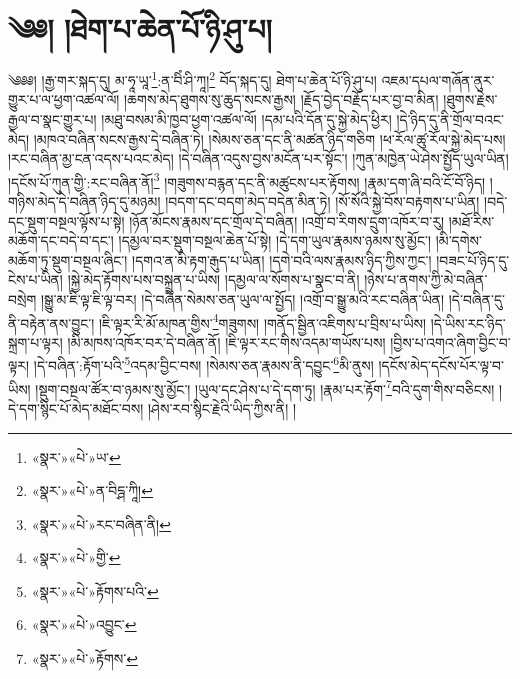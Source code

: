 \chapter{༄༅། །ཐེག་པ་ཆེན་པོ་ཉི་ཤུ་པ།}༄༅༅། །རྒྱ་གར་སྐད་དུ། མ་ཧཱ་ཡཱ་\footnote{«སྣར་»«པེ་»ཡ་}:ན་བིཾ་ཤི་ཀཱ།\footnote{«སྣར་»«པེ་»ན་བིདྴ་ཀཱི།} བོད་སྐད་དུ། ཐེག་པ་ཆེན་པོ་ཉི་ཤུ་པ། འཇམ་དཔལ་གཞོན་ནུར་གྱུར་པ་ལ་ཕྱག་འཚལ་ལོ། །ཆགས་མེད་ཐུགས་སུ་ཆུད་སངས་རྒྱས། །རྗོད་བྱེད་བརྗོད་པར་བྱ་བ་མིན། །ཐུགས་རྗེས་རྒྱལ་བ་སྣང་གྱུར་པ། །མཐུ་བསམ་མི་ཁྱབ་ཕྱག་འཚལ་ལོ། །དམ་པའི་དོན་དུ་སྐྱེ་མེད་ཕྱིར། །དེ་ཉིད་དུ་ནི་གྲོལ་བའང་མེད། །མཁའ་བཞིན་སངས་རྒྱས་དེ་བཞིན་ཏེ། །སེམས་ཅན་དང་ནི་མཚན་ཉིད་གཅིག །ཕ་རོལ་ཚུ་རོལ་སྐྱེ་མེད་པས། །རང་བཞིན་མྱ་ངན་འདས་པའང་མེད། །དེ་བཞིན་འདུས་བྱས་མངོན་པར་སྟོང་། །ཀུན་མཁྱེན་ཡེ་ཤེས་སྤྱོད་ཡུལ་ཡིན། །དངོས་པོ་ཀུན་གྱི་:རང་བཞིན་ནོ།\footnote{«སྣར་»«པེ་»རང་བཞིན་ནི།} །གཟུགས་བརྙན་དང་ནི་མཚུངས་པར་རྟོགས། །རྣམ་དག་ཞི་བའི་ངོ་བོ་ཉིད། །གཉིས་མེད་དེ་བཞིན་ཉིད་དུ་མཉམ། །བདག་དང་བདག་མེད་བདེན་མིན་ཏེ། །སོ་སོའི་སྐྱེ་བོས་བརྟགས་པ་ཡིན། །བདེ་དང་སྡུག་བསྔལ་ལྟོས་པ་སྟེ། །ཉོན་མོངས་རྣམས་དང་གྲོལ་དེ་བཞིན། །འགྲོ་བ་རིགས་དྲུག་འཁོར་བ་རུ། །མཐོ་རིས་མཆོག་དང་བདེ་བ་དང་། །དམྱལ་བར་སྡུག་བསྔལ་ཆེན་པོ་སྟེ། །དེ་དག་ཡུལ་རྣམས་ཉམས་སུ་མྱོང་། །མི་དགེས་མཆོག་ཏུ་སྡུག་བསྔལ་ཞིང་། །དགའ་ན་མི་རྟག་རྒུད་པ་ཡིན། །དགེ་བའི་ལས་རྣམས་ཉིད་ཀྱིས་ཀྱང་། །བཟང་པོ་ཉིད་དུ་ངེས་པ་ཡིན། །སྐྱེ་མེད་རྟོགས་པས་བསྐྲུན་པ་ཡིས། །དམྱལ་ལ་སོགས་པ་སྣང་བ་ནི། །ཉེས་པ་ནགས་ཀྱི་མེ་བཞིན་བསྲེག །སྒྱུ་མ་ཇི་ལྟ་ཇི་ལྟ་བར། །དེ་བཞིན་སེམས་ཅན་ཡུལ་ལ་སྤྱོད། །འགྲོ་བ་སྒྱུ་མའི་རང་བཞིན་ཡིན། །དེ་བཞིན་དུ་ནི་བརྟེན་ནས་བྱུང་། །ཇི་ལྟར་རི་མོ་མཁན་གྱིས་\footnote{«སྣར་»«པེ་»གྱི་}གཟུགས། །གནོད་སྦྱིན་འཇིགས་པ་བྲིས་པ་ཡིས། །དེ་ཡིས་རང་ཉིད་སྐྲག་པ་ལྟར། །མི་མཁས་འཁོར་བར་དེ་བཞིན་ནོ། །ཇི་ལྟར་རང་གིས་འདམ་གཡོས་པས། །བྱིས་པ་འགའ་ཞིག་བྱིང་བ་ལྟར། །དེ་བཞིན་:རྟོག་པའི་\footnote{«སྣར་»«པེ་»རྟོགས་པའི་}འདམ་བྱིང་བས། །སེམས་ཅན་རྣམས་ནི་དབྱུང་\footnote{«སྣར་»«པེ་»འབྱུང་}མི་ནུས། །དངོས་མེད་དངོས་པོར་ལྟ་བ་ཡིས། །སྡུག་བསྔལ་ཚོར་བ་ཉམས་སུ་མྱོང་། །ཡུལ་དང་ཤེས་པ་དེ་དག་ཏུ། །རྣམ་པར་རྟོག་\footnote{«སྣར་»«པེ་»རྟོགས་}བའི་དུག་གིས་བཅིངས། །དེ་དག་སྙིང་པོ་མེད་མཐོང་བས། །ཤེས་རབ་སྙིང་རྗེའི་ཡིད་ཀྱིས་ནི། །
